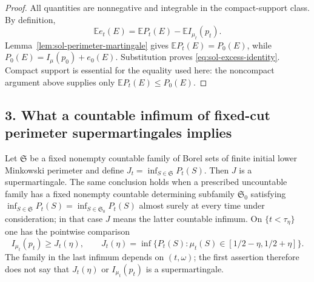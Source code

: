 \documentclass[../main.tex]{subfiles}
\begin{document}
\begin{proof}
All quantities are nonnegative and integrable in the compact-support class.  By definition,
\[
  \mathbb E e_t(E)=\mathbb E P_t(E)-\mathbb E I_{\mu_t}(p_t).
\]
Lemma~\ref{lem:sol-perimeter-martingale} gives
$\mathbb E P_t(E)=P_0(E)$, while
$P_0(E)=I_\mu(p_0)+e_0(E)$.  Substitution proves
\eqref{eq:sol-excess-identity}.  Compact support is essential for the equality used here: the
noncompact argument above supplies only $\mathbb E P_t(E)\leq P_0(E)$.
\end{proof}

\subsection*{3. What a countable infimum of fixed-cut perimeter supermartingales implies}

\begin{lemma}
\label{lem:sol-inf-martingales}
Let $\mathfrak S$ be a fixed nonempty countable family of Borel sets of finite initial lower
Minkowski perimeter and define
$J_t=\inf_{S\in\mathfrak S}P_t(S)$.  Then $J$ is a supermartingale.  The same conclusion holds
when a prescribed uncountable family has a fixed nonempty countable determining subfamily
$\mathfrak S_0$ satisfying
$\inf_{S\in\mathfrak S}P_t(S)=\inf_{S\in\mathfrak S_0}P_t(S)$ almost surely at every time under
consideration; in that case $J$ means the latter countable infimum.  On
$\{t<\tau_\eta\}$ one has the pointwise comparison
\begin{equation}
  I_{\mu_t}(p_t)\geq J_t(\eta),
  \qquad
  J_t(\eta)=\inf\{P_t(S):\mu_t(S)\in[1/2-\eta,1/2+\eta]\}.
  \label{eq:sol-window-infimum}
\end{equation}
The family in the last infimum depends on $(t,\omega)$; the first assertion therefore does not
say that $J_t(\eta)$ or $I_{\mu_t}(p_t)$ is a supermartingale.
\end{lemma}
\end{document}
